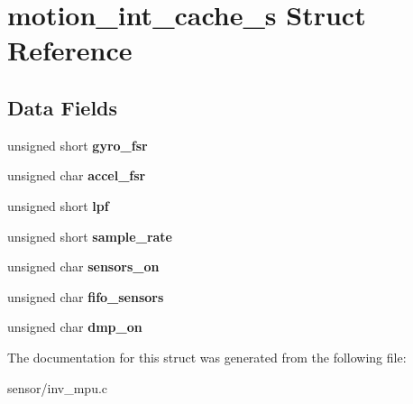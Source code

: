 \hypertarget{structmotion__int__cache__s}{}\section{motion\+\_\+int\+\_\+cache\+\_\+s Struct Reference}
\label{structmotion__int__cache__s}
\subsection*{Data Fields}
\begin{DoxyCompactItemize}
\item 
unsigned short {\bfseries gyro\+\_\+fsr}\hypertarget{structmotion__int__cache__s_a6424d033f39042e9e1105c14f6fa89d7}{}\label{structmotion__int__cache__s_a6424d033f39042e9e1105c14f6fa89d7}

\item 
unsigned char {\bfseries accel\+\_\+fsr}\hypertarget{structmotion__int__cache__s_a97d5de8aa2fab5cc81ca2180130fc6ac}{}\label{structmotion__int__cache__s_a97d5de8aa2fab5cc81ca2180130fc6ac}

\item 
unsigned short {\bfseries lpf}\hypertarget{structmotion__int__cache__s_a0ba1d4e0bb375eb3050352ddef12d25f}{}\label{structmotion__int__cache__s_a0ba1d4e0bb375eb3050352ddef12d25f}

\item 
unsigned short {\bfseries sample\+\_\+rate}\hypertarget{structmotion__int__cache__s_a1aa4e026c4d2f691506f2d713a405aea}{}\label{structmotion__int__cache__s_a1aa4e026c4d2f691506f2d713a405aea}

\item 
unsigned char {\bfseries sensors\+\_\+on}\hypertarget{structmotion__int__cache__s_a90574f8e8515ef8fee3114ba7e0ddc5c}{}\label{structmotion__int__cache__s_a90574f8e8515ef8fee3114ba7e0ddc5c}

\item 
unsigned char {\bfseries fifo\+\_\+sensors}\hypertarget{structmotion__int__cache__s_ae3cc01b3471d10bd06f81fbf628f3e19}{}\label{structmotion__int__cache__s_ae3cc01b3471d10bd06f81fbf628f3e19}

\item 
unsigned char {\bfseries dmp\+\_\+on}\hypertarget{structmotion__int__cache__s_a49fb51079238683b21264827348b5968}{}\label{structmotion__int__cache__s_a49fb51079238683b21264827348b5968}

\end{DoxyCompactItemize}


The documentation for this struct was generated from the following file\+:\begin{DoxyCompactItemize}
\item 
sensor/inv\+\_\+mpu.\+c\end{DoxyCompactItemize}
